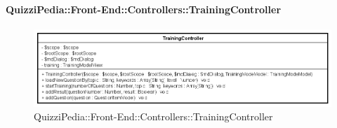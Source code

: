 \paragraph{QuizziPedia::Front-End::Controllers::TrainingController}
\begin{figure} [ht]
	\centering
	\includegraphics[scale=0.6]{UML/Classi/Front-End/QuizziPedia_Front-end_Controller_TrainingController.png}
	\caption{QuizziPedia::Front-End::Controllers::TrainingController}
\end{figure} \FloatBarrier
